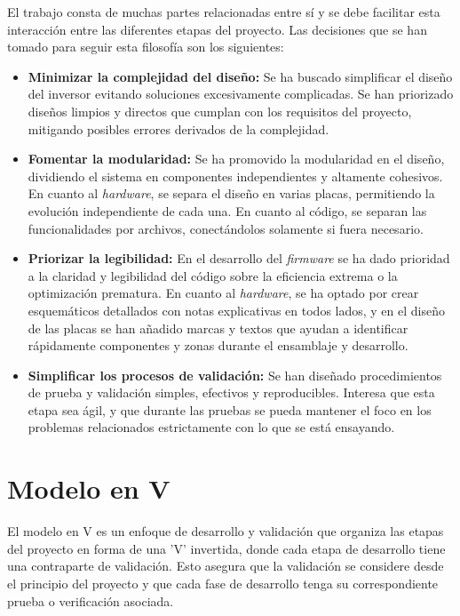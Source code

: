 El trabajo consta de muchas partes relacionadas entre sí y se debe facilitar esta interacción entre las diferentes etapas del proyecto. Las decisiones que se han tomado para seguir esta filosofía son los siguientes:

\begin{itemize}
	\item \textbf{Minimizar la complejidad del diseño:} Se ha buscado simplificar el diseño del inversor evitando soluciones excesivamente complicadas. Se han priorizado diseños limpios y directos que cumplan con los requisitos del proyecto, mitigando posibles errores derivados de la complejidad.
	
	\item \textbf{Fomentar la modularidad:} Se ha promovido la modularidad en el diseño, dividiendo el sistema en componentes independientes y altamente cohesivos. En cuanto al \textit{hardware}, se separa el diseño en varias placas, permitiendo la evolución independiente de cada una. En cuanto al código, se separan las funcionalidades por archivos, conectándolos solamente si fuera necesario.
		
	\item \textbf{Priorizar la legibilidad:} En el desarrollo del \textit{firmware} se ha dado prioridad a la claridad y legibilidad del código sobre la eficiencia extrema o la optimización prematura. En cuanto al \textit{hardware}, se ha optado por crear esquemáticos detallados con notas explicativas en todos lados, y en el diseño de las placas se han añadido marcas y textos que ayudan a identificar rápidamente componentes y zonas durante el ensamblaje y desarrollo.
	
	\item \textbf{Simplificar los procesos de validación:} Se han diseñado procedimientos de prueba y validación simples, efectivos y reproducibles. Interesa que esta etapa sea ágil, y que durante las pruebas se pueda mantener el foco en los problemas relacionados estrictamente con lo que se está ensayando.	
	
\end{itemize}


\section{Modelo en V}
El modelo en V es un enfoque de desarrollo y validación que organiza las etapas del proyecto en forma de una 'V' invertida, donde cada etapa de desarrollo tiene una contraparte de validación. Esto asegura que la validación se considere desde el principio del proyecto y que cada fase de desarrollo tenga su correspondiente prueba o verificación asociada.

